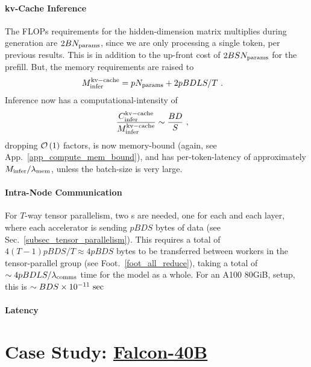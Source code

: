 \documentclass[11pt]{article}
\begin{document}
\paragraph{kv-Cache Inference}
The FLOPs requirements for the hidden-dimension matrix multiplies during generation are $2BN _{ {\rm params}  } $,
since we are only processing a single token, per previous results.   This is in addition to the up-front cost of $ 2BSN _{
{\rm params}} $ for the prefill. But, the memory requirements are raised to
\begin{align}
    M _{ {\rm infer}  }^{ {\rm kv-cache}  } &=pN _{ {\rm params}  } + 2pBDLS/T\ .
\end{align}
Inference now has a computational-intensity of
\begin{align}
    \frac{ C _{ {\rm infer} } ^{ {\rm kv-cache} } }{ M _{ {\rm infer}  }^{ {\rm kv-cache}  } } & \sim \frac{ BD }{ S } \ ,
\end{align}
dropping $ \mathcal{O} \left( 1 \right)  $ factors, is now memory-bound (again, see
App.~\ref{app_compute_mem_bound}), and has per-token-latency of approximately $ M _{ {\rm infer} }/
\lambda _{ {\rm mem} }$, unless the batch-size is very large.


\paragraph{Intra-Node Communication} For $ T $-way tensor parallelism, two s are
needed, one for each  and each  layer, where each
accelerator is sending $ pBDS  $ bytes of data (see Sec.~\ref{subsec_tensor_parallelism}). This
requires a total of $ 4\left ( T-1 \right ) pBDS/T \approx 4pBDS $ bytes to be transferred between
workers in the tensor-parallel group (see Foot.~\ref{foot_all_reduce}), taking a total of $ \sim  4pBDLS/
\lambda _{ {\rm comms} }  $ time for the model as a whole. For an A100 80GiB,  setup, this is $ \sim
BDS \times  10 ^{ -11 } \ {\rm sec} $


\paragraph{Latency}



\section{Case Study: \href{https://huggingface.co/tiiuae/falcon-40b-instruct?_sm_vck=j230jZ2ssDkkPfJTfRt6tjQNTQZJ65N7VDWmj5Ff6f3jZ3mhh2Pq}{Falcon-40B}}
\end{document}
